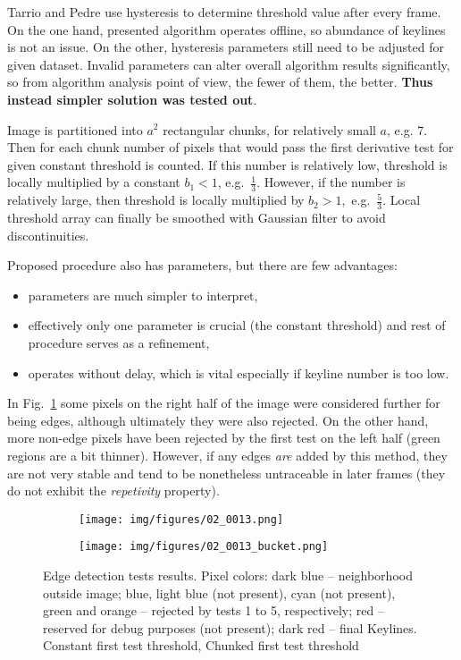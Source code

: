 Tarrio and Pedre use hysteresis to determine threshold value after every frame. On the one hand, presented algorithm operates offline, so abundance of keylines is not an issue. On the other, hysteresis parameters still need to be adjusted for given dataset. Invalid parameters can alter overall algorithm results significantly, so from algorithm analysis point of view, the fewer of them, the better. \textbf{Thus instead simpler solution was tested out}.

Image is partitioned into $a^2$ rectangular chunks, for relatively small $a$, e.g. 7. Then for each chunk number of pixels that would pass the first derivative test for given constant threshold is counted. If this number is relatively low, threshold is locally multiplied by a constant ${b_{1} < 1}$, e.g.~$\frac{1}{3}$. However, if the number is relatively large, then threshold is locally multiplied by ${b_{2} > 1}$,~e.g.~$\frac{5}{3}$. Local threshold array can finally be smoothed with Gaussian filter to avoid discontinuities.

Proposed procedure also has parameters, but there are few advantages:
\begin{itemize}
	\itemsep0em
	\item parameters are much simpler to interpret,
	\item effectively only one parameter is crucial (the constant threshold) and rest of procedure serves as a refinement,
	\item operates without delay, which is vital especially if keyline number is too low.
\end{itemize}

In Fig.~\ref{fig:bucket} some pixels on the right half of the image were considered further for being edges, although ultimately they were also rejected. On the other hand, more non-edge pixels have been rejected by the first test on the left half (green regions are a bit thinner). However, if any edges \textit{are} added by this method, they are not very stable and tend to be nonetheless untraceable in later frames (they do not exhibit the \textit{repetivity} property).

\begin{figure}[ht]
	\centering
	\begin{subfigure}{1\textwidth}
		\centering
		\centering\texttt{[image: img/figures/02\_0013.png]}
		\subcaption{\label{fig:bucket_a}}
	\end{subfigure}
	\begin{subfigure}{1\textwidth}
		\centering
		\centering\texttt{[image: img/figures/02\_0013\_bucket.png]}
		\subcaption{\label{fig:bucket_b}}
	\end{subfigure}
	\caption{\label{fig:bucket} Edge detection tests results. Pixel colors: dark blue -- neighborhood outside image; blue, light blue (not present), cyan (not present), green and orange -- rejected by tests 1 to 5, respectively; red -- reserved for debug purposes (not present); dark red -- final Keylines. \protect{} Constant first test threshold,
		\protect{} Chunked first test threshold}
\end{figure}

